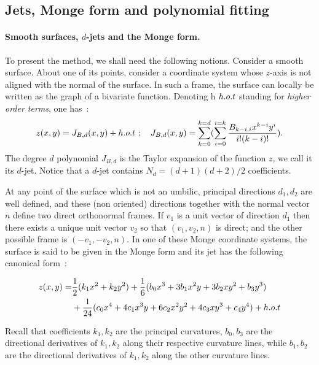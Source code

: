 \subsection{Jets, Monge form and polynomial fitting}

\paragraph{Smooth surfaces, $d$-jets and the Monge form.}
%
To present the method, we shall need the following notions. Consider a
smooth surface.  About one of its points, consider a coordinate system
whose $z$-axis is not aligned with the normal of the surface. In such
a frame, the surface can locally be written as the graph of a
bivariate function. Denoting h $h.o.t$ standing for {\em
higher order terms}, one has~:
%
\begin{equation}
z(x,y)=J_{B,d}(x,y) + h.o.t \ ; \quad 
J_{B,d}(x,y)=\sum_{k=0}^{k=d}(\sum_{i=0}^{i=k}
\frac{B_{k-i,i}x^{k-i}y^{i}}{i!(k-i)!}).
\end{equation}
The degree $d$ polynomial $J_{B,d}$ is the Taylor expansion of the
function $z$, we call it its $d$-jet. Notice that a $d$-jet contains
$N_d=(d+1)(d+2)/2$ coefficients.

At any point of the surface which is not an umbilic, principal
directions $d_1, d_2$ are well defined, and these (non oriented)
directions together with the normal vector $n$ define two direct
orthonormal frames. If $v_1$ is a unit vector of direction $d_1$ then
there exists a unique unit vector $v_2$ so that $(v_1,v_2,n)$ is
direct; and the other possible frame is $(-v_1,-v_2,n)$. In one of
these Monge coordinate systems, the surface is said to be given in the
Monge form and its jet has the following canonical form~:

\begin{eqnarray}
\label{eq:monge}
z(x,y) =  & \frac{1}{2}(k_1x^2 + k_2y^2)+
	\frac{1}{6}(b_0x^3+3b_1x^2y+3b_2xy^2+b_3y^3) \\
  &  +\frac{1}{24}(c_0x^4+4c_1x^3y+6c_2x^2y^2+4c_3xy^3+c_4y^4) + h.o.t
\end{eqnarray}

Recall that coefficients $k_1, k_2$ are the principal curvatures,
$b_0,b_3$ are the directional derivatives of $k_1,k_2$ along their
respective curvature lines, while $b_1,b_2$ are the directional
derivatives of $k_1,k_2$ along the other curvature lines.

